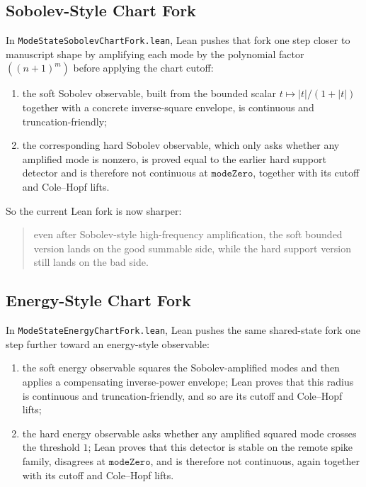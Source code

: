 \documentclass[11pt]{article}
\begin{document}
\subsection{Sobolev-Style Chart Fork}

In \texttt{ModeStateSobolevChartFork.lean}, Lean pushes that fork one step
closer to manuscript shape by amplifying each mode by the polynomial factor
\(((n+1)^m)\) before applying the chart cutoff:
\begin{enumerate}[leftmargin=1.5em]
  \item the soft Sobolev observable, built from the bounded scalar
  \(t \mapsto |t|/(1+|t|)\) together with a concrete inverse-square envelope,
  is continuous and truncation-friendly;
  \item the corresponding hard Sobolev observable, which only asks whether any
  amplified mode is nonzero, is proved equal to the earlier hard support
  detector and is therefore not continuous at \(\texttt{modeZero}\), together
  with its cutoff and Cole--Hopf lifts.
\end{enumerate}

So the current Lean fork is now sharper:
\begin{quote}
even after Sobolev-style high-frequency amplification, the soft bounded version
lands on the good summable side, while the hard support version still lands on
the bad side.
\end{quote}

\subsection{Energy-Style Chart Fork}

In \texttt{ModeStateEnergyChartFork.lean}, Lean pushes the same shared-state
fork one step further toward an energy-style observable:
\begin{enumerate}[leftmargin=1.5em]
  \item the soft energy observable squares the Sobolev-amplified modes and
  then applies a compensating inverse-power envelope; Lean proves that this
  radius is continuous and truncation-friendly, and so are its cutoff and
  Cole--Hopf lifts;
  \item the hard energy observable asks whether any amplified squared mode
  crosses the threshold \(1\); Lean proves that this detector is stable on the
  remote spike family, disagrees at \(\texttt{modeZero}\), and is therefore not
  continuous, again together with its cutoff and Cole--Hopf lifts.
\end{enumerate}
\end{document}
